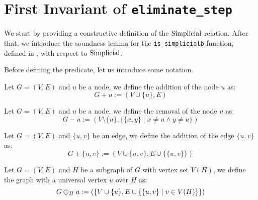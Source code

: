 \section{First Invariant of \texttt{eliminate\_step}}

We start by providing a constructive definition of the $\mathrm{Simplicial}$ relation. After that, we introduce the soundness lemma for the \texttt{is\_simplicialb} function, defined in , with respect to $\mathrm{Simplicial}$.

Before defining the predicate, let us introduce some notation.

\begin{definition}
    Let $G = (V, E)$ and $u$ be a node, we define the addition of the node $u$ as:
    \[
        G + u := (V \cup \{ u \}, E)
    \]
\end{definition}

\begin{definition}
    Let $G = (V, E)$ and $u$ be a node, we define the removal of the node $u$ as:
    \[
        G - u := (V \setminus \{ u \}, \{ \{ x, y \} \mid x \neq u \land y \neq u \})
    \]
\end{definition}

\begin{definition}
    Let $G = (V, E)$ and $\{ u, v \}$ be an edge, we define the addition of the edge $\{ u, v \}$ as:
    \[
        G + \{ u, v \} := (V \cup \{ u, v \}, E \cup \{ \{ u, v \} \})
    \]
\end{definition}

\begin{definition}
    Let $G = (V, E)$ and $H$ be a subgraph of $G$ with vertex set $V(H)$, we define the graph with a universal vertex $u$ over $H$ as:
    \[
        G \oplus_{H} u := (\{ V \cup \{ u \}, E \cup \{ \{ u, v \} \;|\; v \in V(H) \} \})
    \]
\end{definition}

